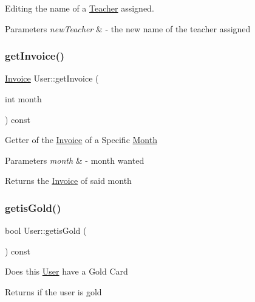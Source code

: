 Editing the name of a \mbox{\hyperlink{class_teacher}{Teacher}} assigned. 


\begin{DoxyParams}{Parameters}
{\em new\+Teacher} & -\/ the new name of the teacher assigned \\
\hline
\end{DoxyParams}
\mbox{\label{class_user_a82cb8a4c8f92d2a31fb2e8b0cff001f6}} 
\subsubsection{\texorpdfstring{get\+Invoice()}{getInvoice()}}
{\footnotesize\ttfamily \mbox{\hyperlink{class_invoice}{Invoice}} User\+::get\+Invoice (\begin{DoxyParamCaption}\item[{int}]{month }\end{DoxyParamCaption}) const}

Getter of the \mbox{\hyperlink{class_invoice}{Invoice}} of a Specific \mbox{\hyperlink{class_month}{Month}} 
\begin{DoxyParams}{Parameters}
{\em month} & -\/ month wanted \\
\hline
\end{DoxyParams}
\begin{DoxyReturn}{Returns}
the \mbox{\hyperlink{class_invoice}{Invoice}} of said month 
\end{DoxyReturn}
\mbox{\label{class_user_abd33fb93abc0209808bab9ffc6c2482c}} 
\subsubsection{\texorpdfstring{getis\+Gold()}{getisGold()}}
{\footnotesize\ttfamily bool User\+::getis\+Gold (\begin{DoxyParamCaption}{ }\end{DoxyParamCaption}) const}

Does this \mbox{\hyperlink{class_user}{User}} have a Gold Card \begin{DoxyReturn}{Returns}
if the user is gold 
\end{DoxyReturn}
\mbox{\label{class_user_a5e98c1820005dd6915bccd75bd573cea}} 
